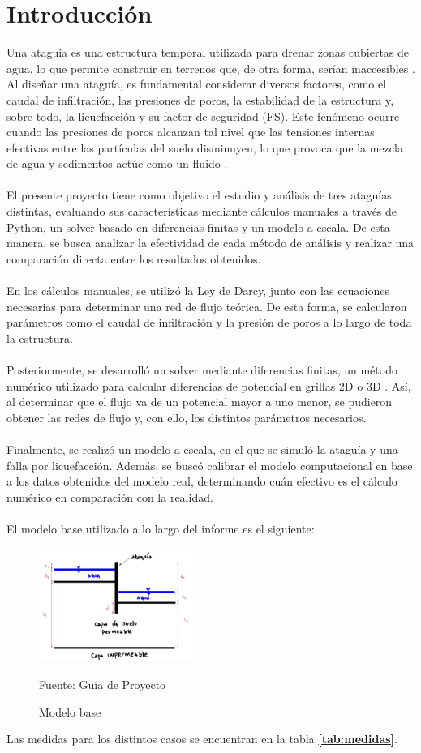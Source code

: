 \part{Introducción}

Una ataguía es una estructura temporal utilizada para drenar zonas cubiertas de agua, 
lo que permite construir en terrenos que, de otra forma, serían inaccesibles 
\cite{madanayaka2018}. Al diseñar una ataguía, es fundamental considerar diversos 
factores, como el caudal de infiltración, las presiones de poros, la estabilidad 
de la estructura y, sobre todo, la licuefacción y su factor de seguridad (FS).
 Este fenómeno ocurre cuando las presiones de poros alcanzan tal nivel que las 
 tensiones internas efectivas entre las partículas del suelo disminuyen, lo que provoca 
 que la mezcla de agua y sedimentos actúe como un fluido \cite{sumer2009}.
\\ \\
El presente proyecto tiene como objetivo el estudio y análisis de tres ataguías 
distintas, evaluando sus características mediante cálculos manuales a través de Python, 
un solver basado en diferencias finitas y un modelo a escala. De esta manera, se busca 
analizar la efectividad de cada método de análisis y realizar una comparación directa entre
 los resultados obtenidos.
\\ \\
En los cálculos manuales, se utilizó la Ley de Darcy, junto con las ecuaciones necesarias
 para determinar una red de flujo teórica. De esta forma, se calcularon parámetros como el
  caudal de infiltración y la presión de poros a lo largo de toda la estructura.
\\ \\
Posteriormente, se desarrolló un solver mediante diferencias finitas, un método numérico 
utilizado para calcular diferencias de potencial en grillas 2D o 3D \cite{zhang2005}. 
Así, al determinar que el flujo va de un potencial mayor a uno menor, se pudieron obtener 
las redes de flujo y, con ello, los distintos parámetros necesarios.
\\ \\
Finalmente, se realizó un modelo a escala, en el que se simuló la ataguía y una falla
 por licuefacción. Además, se buscó calibrar el modelo computacional en base a los 
 datos obtenidos del modelo real, determinando cuán efectivo es el cálculo numérico 
 en comparación con la realidad.
\\ \\
El modelo base utilizado a lo largo del informe es el siguiente:

\begin{figure}[H]
    \centering
    \includegraphics[width=0.45\textwidth]{FOTOS/modelo_base.png}
    \caption{Modelo base}
    Fuente: Guía de Proyecto
    \label{fig:modelo_base}
\end{figure}

Las medidas para los distintos casos se encuentran en la tabla \textbf{\ref{tab:medidas}}.
